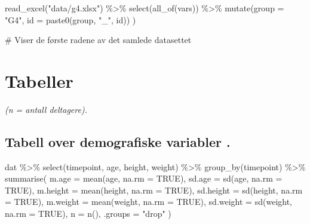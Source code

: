 \documentclass[
  letterpaper,
  DIV=11,
  numbers=noendperiod]{scrreprt}
\newenvironment{Shaded}{\begin{snugshade}}{\end{snugshade}}
\newcommand{\AttributeTok}[1]{\textcolor[rgb]{0.40,0.45,0.13}{#1}}
\newcommand{\CommentTok}[1]{\textcolor[rgb]{0.37,0.37,0.37}{#1}}
\newcommand{\ConstantTok}[1]{\textcolor[rgb]{0.56,0.35,0.01}{#1}}
\newcommand{\FunctionTok}[1]{\textcolor[rgb]{0.28,0.35,0.67}{#1}}
\newcommand{\NormalTok}[1]{\textcolor[rgb]{0.00,0.23,0.31}{#1}}
\newcommand{\SpecialCharTok}[1]{\textcolor[rgb]{0.37,0.37,0.37}{#1}}
\newcommand{\StringTok}[1]{\textcolor[rgb]{0.13,0.47,0.30}{#1}}
\begin{document}
\begin{Shaded}
\begin{Highlighting}[]
\FunctionTok{read\_excel}\NormalTok{(}\StringTok{"data/g4.xlsx"}\NormalTok{) }\SpecialCharTok{\%\textgreater{}\%}
   \FunctionTok{select}\NormalTok{(}\FunctionTok{all\_of}\NormalTok{(vars)) }\SpecialCharTok{\%\textgreater{}\%}
  \FunctionTok{mutate}\NormalTok{(}\AttributeTok{group =} \StringTok{"G4"}\NormalTok{, }
         \AttributeTok{id =} \FunctionTok{paste0}\NormalTok{(group, }\StringTok{"\_"}\NormalTok{, id)) )}


\CommentTok{\# Viser de første radene av det samlede datasettet}
\end{Highlighting}
\end{Shaded}

\section{Tabeller}\label{tabeller}

\emph{(n = antall deltagere).}

\subsection{Tabell over demografiske variabler
.}\label{tabell-over-demografiske-variabler-.}

\begin{Shaded}
\begin{Highlighting}[]
\NormalTok{dat }\SpecialCharTok{\%\textgreater{}\%}
  \FunctionTok{select}\NormalTok{(timepoint, age, height, weight) }\SpecialCharTok{\%\textgreater{}\%}
  \FunctionTok{group\_by}\NormalTok{(timepoint) }\SpecialCharTok{\%\textgreater{}\%}
  \FunctionTok{summarise}\NormalTok{(}
    \AttributeTok{m.age =} \FunctionTok{mean}\NormalTok{(age, }\AttributeTok{na.rm =} \ConstantTok{TRUE}\NormalTok{),}
    \AttributeTok{sd.age =} \FunctionTok{sd}\NormalTok{(age, }\AttributeTok{na.rm =} \ConstantTok{TRUE}\NormalTok{),}
    \AttributeTok{m.height =} \FunctionTok{mean}\NormalTok{(height, }\AttributeTok{na.rm =} \ConstantTok{TRUE}\NormalTok{),}
    \AttributeTok{sd.height =} \FunctionTok{sd}\NormalTok{(height, }\AttributeTok{na.rm =} \ConstantTok{TRUE}\NormalTok{),}
    \AttributeTok{m.weight =} \FunctionTok{mean}\NormalTok{(weight, }\AttributeTok{na.rm =} \ConstantTok{TRUE}\NormalTok{),}
    \AttributeTok{sd.weight =} \FunctionTok{sd}\NormalTok{(weight, }\AttributeTok{na.rm =} \ConstantTok{TRUE}\NormalTok{),}
    \AttributeTok{n =} \FunctionTok{n}\NormalTok{(),}
    \AttributeTok{.groups =} \StringTok{"drop"}
\NormalTok{  )}
\end{Highlighting}
\end{Shaded}
\end{document}

